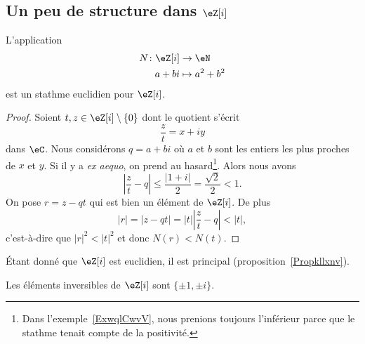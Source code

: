 \subsection{Un peu de structure dans \texorpdfstring{$ \eZ[i]$}{Zi}}

\begin{lemma}   \label{LemSCAlICY}
	L'application
	\begin{equation}
		\begin{aligned}
			N\colon \eZ[i] & \to \eN         \\
			a+bi           & \mapsto a^2+b^2
		\end{aligned}
	\end{equation}
	est un stathme euclidien pour \( \eZ[i]\).
\end{lemma}

\begin{proof}
	Soient \( t,z\in \eZ[i]\setminus\{ 0 \}\) dont le quotient s'écrit
	\begin{equation}
		\frac{ z }{ t }=x+iy
	\end{equation}
	dans \( \eC\). Nous considérons \( q=a+bi\) où \( a\) et \( b\) sont les entiers les plus proches de \( x\) et \( y\). Si il y a \emph{ex aequo}, on prend au hasard\footnote{Dans l'exemple~\ref{ExwqlCwvV}, nous prenions toujours l'inférieur parce que le stathme tenait compte de la positivité.}. Alors nous avons
	\begin{equation}
		| \frac{ z }{ t }-q |\leq \frac{ | 1+i | }{ 2 }=\frac{ \sqrt{2} }{2}<1.
	\end{equation}
	On pose \( r=z-qt\) qui est bien un élément de \( \eZ[i]\). De plus
	\begin{equation}
		| r |=| z-qt |=| t | |\frac{ z }{ t }-q |<| t |,
	\end{equation}
	c'est-à-dire que \( | r |^2<| t |^2\) et donc \( N(r)<N(t)\).
\end{proof}
Étant donné que \( \eZ[i]\) est euclidien, il est principal (proposition~\ref{Propkllxnv}).

\begin{lemma}   \label{LemBMEIiiV}
	Les éléments inversibles de \( \eZ[i]\) sont \( \{ \pm 1,\pm i \}\).
\end{lemma}

